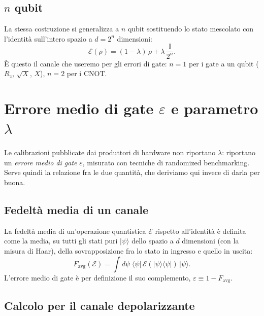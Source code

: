 \documentclass[11pt,a4paper]{article}
\newcommand{\ket}[1]{\lvert #1 \rangle}
\newcommand{\bra}[1]{\langle #1 \rvert}
\begin{document}
\subsection{$n$ qubit}

La stessa costruzione si generalizza a $n$ qubit sostituendo lo stato mescolato con
l'identità sull'intero spazio a $d=2^n$ dimensioni:
\begin{equation}
\mathcal E(\rho) = (1-\lambda)\,\rho + \lambda\,\frac{\mathbb{I}}{2^n}.
\label{eq:depol-nqubit}
\end{equation}
È questo il canale che useremo per gli errori di gate: $n=1$ per i gate a un qubit
($R_z$, $\sqrt X$, $X$), $n=2$ per i CNOT.

\section{Errore medio di gate $\varepsilon$ e parametro $\lambda$}
\label{sec:eps-lambda}

Le calibrazioni pubblicate dai produttori di hardware non riportano $\lambda$: riportano
un \emph{errore medio di gate} $\varepsilon$, misurato con tecniche di randomized
benchmarking. Serve quindi la relazione fra le due quantità, che deriviamo qui invece
di darla per buona.

\subsection{Fedeltà media di un canale}

La fedeltà media di un'operazione quantistica $\mathcal E$ rispetto all'identità è
definita come la media, su tutti gli stati puri $\ket\psi$ dello spazio a $d$
dimensioni (con la misura di Haar), della sovrapposizione fra lo stato in ingresso e
quello in uscita:
\begin{equation}
F_\text{avg}(\mathcal E) = \int d\psi\;\bra\psi\,\mathcal E(\ket\psi\bra\psi)\,\ket\psi .
\end{equation}
L'errore medio di gate è per definizione il suo complemento, $\varepsilon \equiv
1-F_\text{avg}$.

\subsection{Calcolo per il canale depolarizzante}
\end{document}
